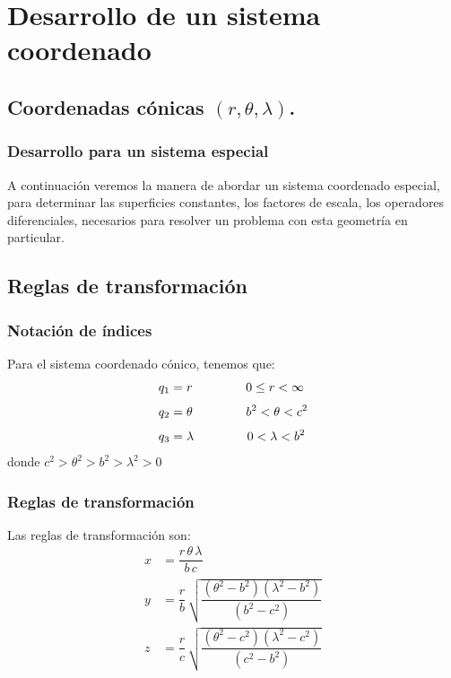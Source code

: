 \documentclass[12pt]{beamer}
\begin{document}
\section{Desarrollo de un sistema coordenado}
\subsection{Coordenadas cónicas \texorpdfstring{$(r, \theta, \lambda)$}{(r, t, l)}.}

\begin{frame}
\frametitle{Desarrollo para un sistema especial}
A continuación veremos la manera de abordar un sistema coordenado especial, para determinar las superficies constantes, los factores de escala, los operadores diferenciales, necesarios para resolver un problema con esta geometría en particular.
\end{frame}

\subsection{Reglas de transformación}
\begin{frame}
\frametitle{Notación de índices}
Para el sistema coordenado cónico, tenemos que:
\pause
\begin{align*}
q_{1} &= r \hspace{1.5cm} 0 \leq r < \infty \\[0.35em]
q_{2} &= \theta \hspace{1.5cm} b^{2} < \theta < c^{2} \\[0.35em]
q_{3} &= \lambda \hspace{1.5cm} 0 < \lambda < b^{2}
\end{align*}
donde $c^{2} > \theta^{2} > b^{2} > \lambda^{2} > 0$
\end{frame}
\begin{frame}
\frametitle{Reglas de transformación}
Las reglas de transformación son:
\pause
\begin{align*}
x &= \dfrac{r \, \theta \, \lambda}{b \, c} \\[0.5em]
y &= \dfrac{r}{b} \, \sqrt{\dfrac{(\theta^{2} - b^{2})(\lambda^{2} - b^{2})}{(b^{2} - c^{2})}} \\[0.5em]
z &= \dfrac{r}{c} \, \sqrt{\dfrac{(\theta^{2} - c^{2})(\lambda^{2} - c^{2})}{(c^{2} - b^{2})}}
\end{align*}
\end{frame}
\end{document}
